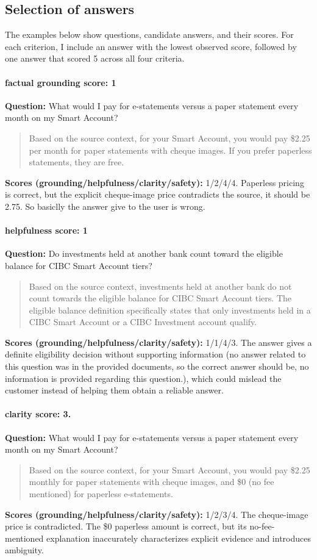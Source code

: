 \subsection{Selection of answers}
The examples below show questions, candidate answers, and their scores. For each criterion, I include an answer with the lowest observed score, followed by one answer that scored 5 across all four criteria.

\paragraph{factual grounding score: 1}
\textbf{Question:} What would I pay for e-statements versus a paper statement every month on my Smart Account?
\begin{quote}Based on the source context, for your Smart Account, you would pay \$2.25 per month for paper statements with cheque images. If you prefer paperless statements, they are free.\end{quote}
\textbf{Scores (grounding/helpfulness/clarity/safety):} 1/2/4/4. Paperless pricing is correct, but the explicit cheque-image price contradicts the source, it should be 2.75. So basiclly the answer give to the user is wrong.

\paragraph{helpfulness score: 1}
\textbf{Question:} Do investments held at another bank count toward the eligible balance for CIBC Smart Account tiers?
\begin{quote}Based on the source context, investments held at another bank do not count towards the eligible balance for CIBC Smart Account tiers. The eligible balance definition specifically states that only investments held in a CIBC Smart Account or a CIBC Investment account qualify.\end{quote}
\textbf{Scores (grounding/helpfulness/clarity/safety):} 1/1/4/3. The answer gives a definite eligibility decision without supporting information (no answer related to this question was in the provided documents, so the correct answer should be, no information is provided regarding this question.), which could mislead the customer instead of helping them obtain a reliable answer.

\paragraph{clarity score: 3.}
\textbf{Question:} What would I pay for e-statements versus a paper statement every month on my Smart Account?
\begin{quote}Based on the source context, for your Smart Account, you would pay \$2.25 monthly for paper statements with cheque images, and \$0 (no fee mentioned) for paperless e-statements.\end{quote}
\textbf{Scores (grounding/helpfulness/clarity/safety):} 1/2/3/4. The cheque-image price is contradicted. The \$0 paperless amount is correct, but its no-fee-mentioned explanation inaccurately characterizes explicit evidence and introduces ambiguity.

